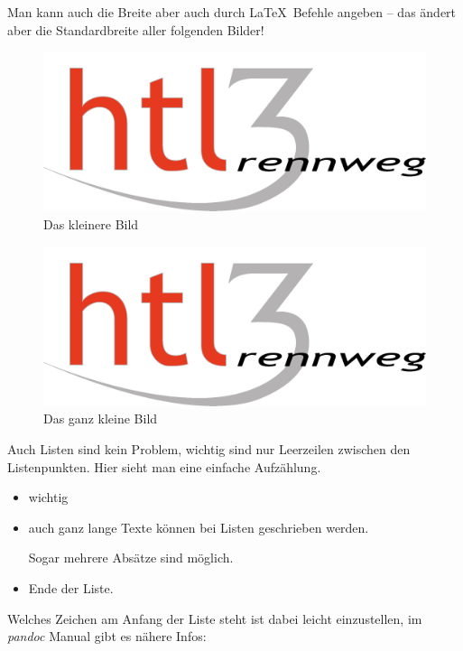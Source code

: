 Man kann auch die Breite aber auch durch La\TeX~Befehle angeben -- das
ändert aber die Standardbreite aller folgenden Bilder!


\begin{figure}[htbp]
\centering
\includegraphics{HTL3RLogo.png}
\caption{Das kleinere Bild}
\end{figure}


\begin{figure}[htbp]
\centering
\includegraphics{HTL3RLogo.png}
\caption{Das ganz kleine Bild}
\end{figure}

Auch Listen sind kein Problem, wichtig sind nur Leerzeilen zwischen den
Listenpunkten. Hier sieht man eine einfache Aufzählung.

\begin{itemize}
\item
  wichtig
\item
  auch ganz lange Texte können bei Listen geschrieben werden.

  Sogar mehrere Absätze sind möglich.
\item
  Ende der Liste.
\end{itemize}

Welches Zeichen am Anfang der Liste steht ist dabei leicht einzustellen,
im \emph{pandoc} Manual gibt es nähere Infos:

